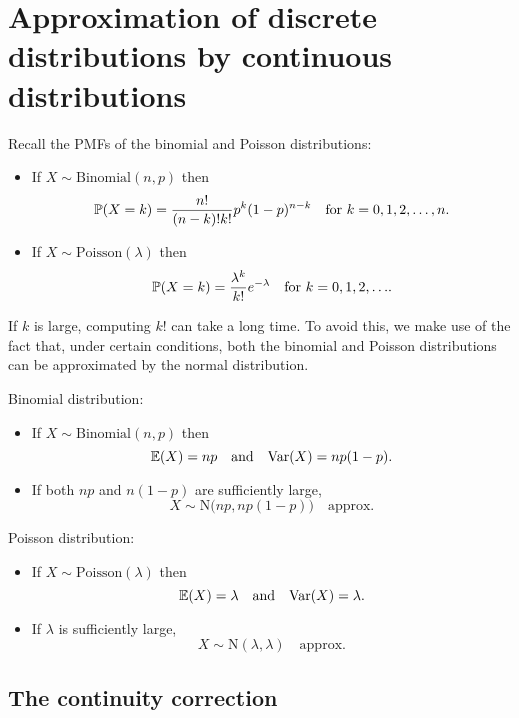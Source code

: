 \documentclass[lecture]{csm}
\newcommand{\prob}{\mathbb{P}}
\newcommand{\expe}{\mathbb{E}}
\newcommand{\var}{\text{Var}}
\def\it{\item}
\def\bit{\begin{itemize}}
\def\eit{\end{itemize}}
\begin{document}
\maketitle
\tableofcontents


\section{Approximation of discrete distributions by continuous distributions}
Recall the PMFs of the binomial and Poisson distributions:
\bit
\it If $X\sim\text{Binomial}(n,p)$ then 
\[
\prob(X=k)=\displaystyle\frac{n!}{(n-k)!k!} p^k(1-p)^{n-k} \text{\quad for $k=0,1,2,\ldots,n$}.
\]
\it If $X\sim\text{Poisson}(\lambda)$ then 
\[
\prob(X=k)=\displaystyle\frac{\lambda^k}{k!}e^{-\lambda} \text{\quad for $k=0,1,2,\ldots$}.
\]
\eit

If $k$ is large, computing $k!$ can take a long time. To avoid this, we make use of the fact that, under certain conditions, both the binomial and Poisson distributions can be approximated by the normal distribution.

\newpage
Binomial distribution:
\bit
\it If $X\sim\text{Binomial}(n,p)$ then %
\[
\expe(X)=np \text{\quad and\quad} \var(X)=np(1-p).
\]
%
\it If both $np$ and $n(1-p)$ are sufficiently large,
\[
X\sim\text{N}\big(np,np(1-p)\big)\quad\text{approx.}
\]
\eit

\vspace*{2ex}
Poisson distribution:
\bit
\it If $X\sim\text{Poisson}(\lambda)$ then %
\[
\expe(X)=\lambda \text{\quad and\quad}\var(X)=\lambda.
\]
%
\it If $\lambda$ is sufficiently large,
\[
X\sim\text{N}(\lambda,\lambda)\quad\text{approx.}
\]
\eit

\newpage
\subsection{The continuity correction}
\end{document}
